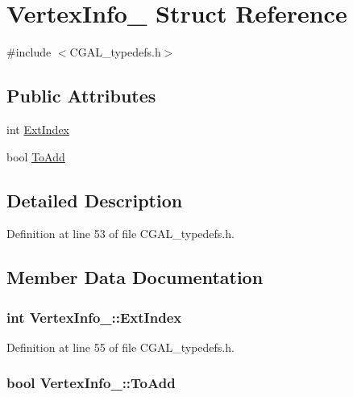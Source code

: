 \hypertarget{struct_vertex_info__3}{}\section{Vertex\+Info\+\_ Struct Reference}
\label{struct_vertex_info__3}


{\ttfamily \#include $<$C\+G\+A\+L\+\_\+typedefs.\+h$>$}

\subsection*{Public Attributes}
\begin{DoxyCompactItemize}
\item 
int \hyperlink{struct_vertex_info__3_a145e219133c20b7d6da13a268a8d5ea3}{Ext\+Index}
\item 
bool \hyperlink{struct_vertex_info__3_a513443f8c9f518083b504e3c08f09a67}{To\+Add}
\end{DoxyCompactItemize}


\subsection{Detailed Description}


Definition at line 53 of file C\+G\+A\+L\+\_\+typedefs.\+h.



\subsection{Member Data Documentation}
\hypertarget{struct_vertex_info__3_a145e219133c20b7d6da13a268a8d5ea3}{}
\subsubsection[{Ext\+Index}]{\setlength{\rightskip}{0pt plus 5cm}int Vertex\+Info\+\_\+::\+Ext\+Index}\label{struct_vertex_info__3_a145e219133c20b7d6da13a268a8d5ea3}


Definition at line 55 of file C\+G\+A\+L\+\_\+typedefs.\+h.

\hypertarget{struct_vertex_info__3_a513443f8c9f518083b504e3c08f09a67}{}
\subsubsection[{To\+Add}]{\setlength{\rightskip}{0pt plus 5cm}bool Vertex\+Info\+\_\+::\+To\+Add}\label{struct_vertex_info__3_a513443f8c9f518083b504e3c08f09a67}


